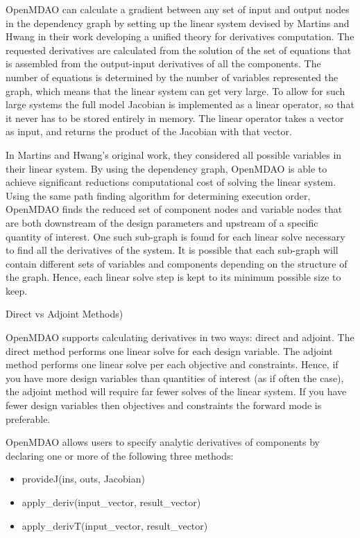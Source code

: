 \documentclass[]{aiaa-tc} %
\begin{document}
    OpenMDAO can calculate a gradient between any set of input and output nodes in the
    dependency graph by setting up the linear system devised by Martins and Hwang \cite{Martins2012} in their 
    work developing a unified theory for derivatives computation. 
    The requested derivatives are calculated from the solution of the set of equations that is assembled
    from the output-input derivatives of all the components. The number of equations 
    is determined by the number of variables represented the graph, which means that the linear 
    system can get very large. To allow for such large systems the full model Jacobian is implemented as 
    a linear operator, so that it never has to be stored entirely in memory. The
    linear operator takes a vector as input, and returns the product of the Jacobian with that vector.
    
    In Martins and Hwang's original work, they considered all possible variables in their linear system. 
    By using the dependency graph, OpenMDAO is able to achieve significant reductions computational cost of 
    solving the linear system. Using the same path finding algorithm for determining execution order, 
    OpenMDAO finds the reduced set of component nodes and variable nodes that are both downstream of the design parameters
    and upstream of a specific quantity of interest. One such sub-graph is found for each linear solve necessary to
    find all the derivatives of the system. It is possible that each sub-graph will contain different sets 
    of variables and components depending on the structure of the graph. Hence, each linear solve step 
    is kept to its minimum possible size to keep. 

    \subject(Direct vs Adjoint Methods)

    OpenMDAO supports calculating derivatives in two ways: direct and adjoint. The direct method performs
    one linear solve for each design variable. The adjoint method performs one linear solve per each objective 
    and constraints. Hence, if you have more design variables than quantities of interest (as if often the case), 
    the adjoint method will require far fewer solves of the linear system. If you have fewer design variables then 
    objectives and constraints the forward mode is preferable. 

    OpenMDAO allows users to specify analytic derivatives of components by declaring one or more of the following three
    methods: 

    \begin{itemize}
        \item provideJ(ins, outs, Jacobian)
        \item apply_deriv(input_vector, result_vector)
        \item apply_derivT(input_vector, result_vector)
    \end{itemize}
    
\end{document}
